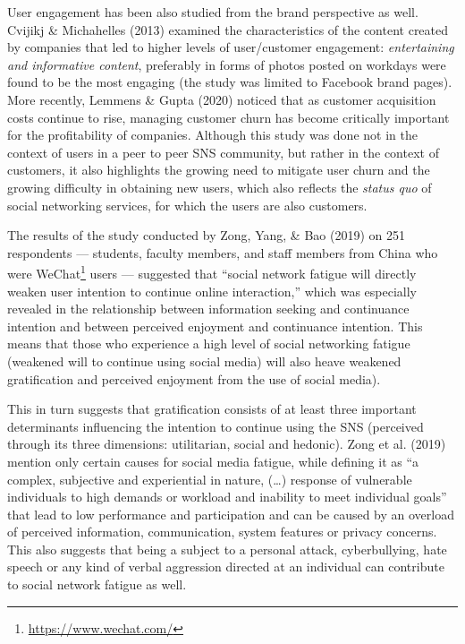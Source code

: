 \documentclass[10pt,dvipsnames]{scrartcl}
\begin{document}
User engagement has been also studied from the brand perspective as
well. Cvijikj \& Michahelles (2013) examined the characteristics of the
content created by companies that led to higher levels of user/customer
engagement: \textit{entertaining and informative content}, preferably in
forms of photos posted on workdays were found to be the most engaging
(the study was limited to Facebook brand pages). More recently, Lemmens
\& Gupta (2020) noticed that as customer acquisition costs continue to
rise, managing customer churn has become critically important for the
profitability of companies. Although this study was done not in the
context of users in a peer to peer SNS community, but rather in the
context of customers, it also highlights the growing need to mitigate
user churn and the growing difficulty in obtaining new users, which also
reflects the \textit{status quo} of social networking services, for
which the users are also customers.

The results of the study conducted by Zong, Yang, \& Bao (2019) on 251
respondents --- students, faculty members, and staff members from China
who were WeChat\footnote{\url{https://www.wechat.com/}} users ---
suggested that ``social network fatigue will directly weaken user
intention to continue online interaction,'' which was especially
revealed in the relationship between information seeking and continuance
intention and between perceived enjoyment and continuance intention.
This means that those who experience a high level of social networking
fatigue (weakened will to continue using social media) will also heave
weakened gratification and perceived enjoyment from the use of social
media).

This in turn suggests that gratification consists of at least three
important determinants influencing the intention to continue using the
SNS (perceived through its three dimensions: utilitarian, social and
hedonic). Zong et al. (2019) mention only certain causes for social
media fatigue, while defining it as ``a complex, subjective and
experiential in nature, (\dots) response of vulnerable individuals to
high demands or workload and inability to meet individual goals'' that
lead to low performance and participation and can be caused by an
overload of perceived information, communication, system features or
privacy concerns. This also suggests that being a subject to a personal
attack, cyberbullying, hate speech or any kind of verbal aggression
directed at an individual can contribute to social network fatigue as
well.
\end{document}
